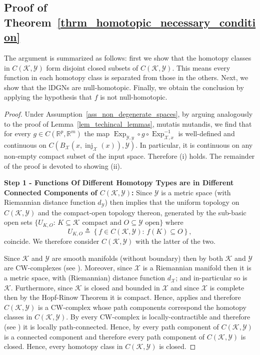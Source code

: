 \documentclass[anon,12pt]{colt2021} %
\newcommand{\rr}{{\mathbb{R}}}
\newcommand{\rrflex}[1]{{\ensuremath{\rr^{#1}
}}}
\newcommand{\rrm}{{\rrflex{m}}}
\newcommand{\rrp}{{\rrflex{p}}}
\newcommand{\xxx}{\mathcal{X}}
\newcommand{\yyy}{\mathcal{Y}}
\newcommand{\kkk}{{\mathscr{K}}}
\begin{document}
\subsection{{Proof of Theorem~\ref{thrm_homotopic_necessary_condition}}}\label{ss_Appendix_proof_necessary_condition}
The argument is summarized as follows: first we show that the homotopy classes in $C(\kkk,\yyy)$ form disjoint closed subsets of $C(\kkk,\yyy)$.  This means every function in each homotopy class is separated from those in the others.  Next, we show that the lDGNs are null-homotopic.  Finally, we obtain the conclusion by applying the hypothesis that $f$ is not null-homotopic.
\begin{proof}%
Under Assumption~\ref{ass_non_degenerate_spaces}, by arguing analogously to the proof of Lemma~\ref{lem_techincal_lemmas}, mutatis mutandis, we find that for every $g \in C(\rrp,\rrm)$ the map 
$
\operatorname{Exp}_{\yyy,y}\circ 
g
\circ \operatorname{Exp}_{\xxx,x}^{-1}
$ is well-defined and continuous on 
$
C\left(
B_{\xxx}(x,\operatorname{inj}_{\xxx}(x))
,
\yyy
\right)
.
$  
In particular, it is continuous on any non-empty compact subset of the input space.  Therefore (i) holds.  The remainder of the proof is devoted to showing (ii).  


\textbf{Step 1 - Functions Of Different Homotopy Types are in Different Connected Components of $C(\kkk,\yyy)$:}  
Since $\yyy$ is a metric space (with Riemannian distance function $d_{\yyy}$) then \citep[Theorem 46.8]{munkres2014topology} implies that the uniform topology on $C(\kkk,\yyy)$ and the compact-open topology thereon, generated by the sub-basic open sets $\{U_{K,O}:\,K\subseteq \kkk\mbox{ compact and } O\subseteq \yyy \mbox{ open}\}$ where
$$
U_{K,O}\triangleq 
\left\{
f\in C(\kkk,\yyy):\,
f(K)\subseteq O
\right\},
$$
coincide.  We therefore consider $C(\kkk,\yyy)$ with the latter of the two.   

Since $\kkk$ and $\yyy$ are smooth manifolds (without boundary) then by \citep[Example 0.3]{HatcherAlgebraicTopology} both $\kkk$ and $\yyy$ are CW-complexes (see \citep[page 5]{HatcherAlgebraicTopology}).  Moreover, since $\xxx$ is a Riemannian manifold then it is a metric space, with (Riemannian) distance function $d_{\xxx}$; and in-particular so is $\kkk$.  Furthermore, since $\kkk$ is closed and bounded in $\xxx$ and since $\xxx$ is complete then by the Hopf-Rinow Theorem it is compact.  Hence, \citep[Corollary 2]{MilnorHomotopyTypeCWComplexMappingSpace1959} applies and therefore $C(\kkk,\yyy)$ is a CW-complex whose path components correspond the homotopy classes in $C(\kkk,\yyy)$.  By \citep[Proposition A.4]{HatcherAlgebraicTopology} every CW-complex is locally-contractible and therefore (see \citep[page 522]{HatcherAlgebraicTopology}) it is locally path-connected.  Hence, by \citep[Theorem 25.5]{munkres2014topology} every path component of $C(\kkk,\yyy)$ is a connected component and therefore every path component of $C(\kkk,\yyy)$ is closed.  Hence, every homotopy class in $C(\kkk,\yyy)$ is closed.  


\end{proof}
\end{document}
